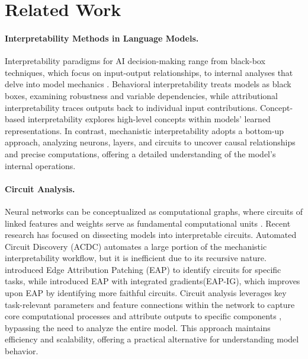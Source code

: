 \section{Related Work}
\paragraph{Interpretability Methods in Language Models.} Interpretability paradigms for AI decision-making range from black-box techniques, which focus on input-output relationships, to internal analyses that delve into model mechanics \citep{bereska2024mechanistic}. Behavioral interpretability \citep{warstadt2020blimp,covert2021explaining,casalicchio2018visualizing} treats models as black boxes, examining robustness and variable dependencies, while attributional interpretability \citep{sundararajan2017axiomatic,smilkov2017smoothgrad,shrikumar2017learning} traces outputs back to individual input contributions. Concept-based interpretability \citep{belinkov2022probing,burns2023discovering,zou2023representation,yang2024makes,huimproving} explores high-level concepts within models' learned representations. In contrast, mechanistic interpretability \citep{bereska2024mechanistic} adopts a bottom-up approach, analyzing neurons, layers, and circuits to uncover causal relationships and precise computations, offering a detailed understanding of the model's internal operations.

\paragraph{Circuit Analysis.} Neural networks can be conceptualized as computational graphs, where circuits of linked features and weights serve as fundamental computational units \citep{bereska2024mechanistic}. Recent research has focused on dissecting models into interpretable circuits. Automated Circuit Discovery (ACDC) \citep{conmy2023towards} automates a large portion of the mechanistic interpretability workflow, but it is inefficient due to its recursive nature. \citet{syed2023attribution} introduced Edge Attribution Patching (EAP) to identify circuits for specific tasks, while \citet{hanna2024have} introduced EAP with integrated gradients(EAP-IG), which improves upon EAP by identifying more faithful circuits. Circuit analysis leverages key task-relevant parameters \citep{bereska2024mechanistic} and feature connections \citep{he2024dictionary} within the network to capture core computational processes and attribute outputs to specific components \citep{miller2024transformer}, bypassing the need to analyze the entire model. This approach maintains efficiency and scalability, offering a practical alternative for understanding model behavior.

